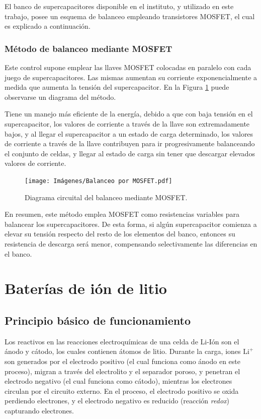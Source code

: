 El banco de supercapacitores disponible en el instituto, y utilizado en este trabajo, posee un esquema de balanceo empleando transistores MOSFET, el cual es explicado a continuación.

\subsubsection{Método de balanceo mediante MOSFET}

Este control supone emplear las llaves MOSFET colocadas en paralelo con cada juego de supercapacitores. Las mismas aumentan su corriente exponencialmente a medida que aumenta la tensión del supercapacitor. En la Figura \ref{balanceo-mosfet} puede observarse un diagrama del método.

Tiene un manejo más eficiente de la energía, debido a que con baja tensión en el supercapacitor, los valores de corriente a través de la llave son extremadamente bajos, y al llegar el supercapacitor a un estado de carga determinado, los valores de corriente a través de la llave contribuyen para ir progresivamente balanceando el conjunto de celdas, y llegar al estado de carga sin tener que descargar elevados valores de corriente.

\begin{figure}[hbt!]
  \centering
  \texttt{[image: Imágenes/Balanceo por MOSFET.pdf]}
  \caption{Diagrama circuital del balanceo mediante MOSFET.}
  \label{balanceo-mosfet}
\end{figure} 

En resumen, este método emplea MOSFET como resistencias variables para balancear los supercapacitores. De esta forma, si algún supercapacitor comienza a elevar su tensión respecto del resto de los elementos del banco, entonces su resistencia de descarga será menor, compensando selectivamente las diferencias en el banco.

\section{Baterías de ión de litio}

\subsection{Principio básico de funcionamiento}

Los reactivos en las reacciones electroquímicas de una celda de Li-Ión son el ánodo y cátodo, los cuales contienen átomos de litio. Durante la carga, iones $\text{Li}^+$ son generados por el electrodo positivo (el cual funciona como ánodo en este proceso), migran a través del electrolito y el separador poroso, y penetran el electrodo negativo (el cual funciona como cátodo), mientras los electrones circulan por el circuito externo. En el proceso, el electrodo positivo se oxida perdiendo electrones, y el electrodo negativo es reducido (reacción \emph{redox}) capturando electrones.

